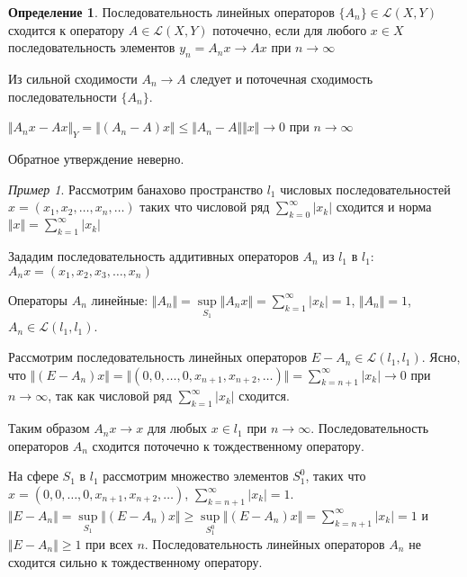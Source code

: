 \documentclass[12pt,a4paper,titlepage,oneside]{book}
\theoremstyle{definition}
\newtheorem*{definition}{Определение}
\theoremstyle{plain}
\theoremstyle{remark}
\theoremstyle{remark}
\newtheorem*{example}{Пример}
\theoremstyle{remark}
\theoremstyle{remark}
\theoremstyle{plain}
\theoremstyle{plain}
\begin{document}
\begin{definition}
Последовательность линейных операторов $\{A_n\}\in \mathcal{L}(X,Y)$ сходится к оператору $A\in \mathcal{L}(X,Y)$ поточечно, если для любого $x\in X$ последовательность элементов $y_n=A_nx\to Ax$ при $n\to \infty$
\end{definition}

Из сильной сходимости $A_n\to A$ следует и поточечная сходимость последовательности $\{A_n\}$.

\begin{center}
$\Vert A_nx-Ax\Vert_Y = \Vert(A_n-A)x\Vert\le \Vert A_n-A\Vert \Vert x\Vert\to 0$ при $n\to \infty$
\end{center}

Обратное утверждение неверно.

\begin{example}
Рассмотрим банахово пространство $l_1$ числовых последовательностей $x=(x_1,x_2,\ldots,x_n,\ldots)$ таких что числовой ряд $\displaystyle\sum_{k=0}^\infty \lvert x_k\rvert $ сходится и норма $\Vert x\Vert=\displaystyle\sum_{k=1}^\infty \lvert x_k\rvert $

Зададим последовательность аддитивных операторов $A_n$ из $l_1$ в $l_1$:
$A_nx=(x_1,x_2,x_3,\ldots,x_n)$

Операторы $A_n$ линейные:
$\Vert A_n\Vert=\sup \limits_{S_1} \Vert A_nx\Vert=\displaystyle\sum_{k=1}^\infty \lvert x_k\rvert =1$, $\Vert A_n\Vert=1$, $A_n\in \mathcal{L}(l_1,l_1)$.

Рассмотрим последовательность линейных операторов $E-A_n\in \mathcal{L}(l_1,l_1)$. Ясно, что $\Vert(E-A_n)x\Vert=\Vert(0,0,\ldots,0,x_{n+1},x_{n+2},\ldots)\Vert=\displaystyle\sum_{k=n+1}^\infty \lvert x_k\rvert  \to 0$ при $n\to \infty$, так как числовой ряд $\displaystyle\sum_{k=1}^\infty \lvert x_k\rvert $ сходится.

Таким образом $A_nx\to x$ для любых $x\in l_1$ при $n\to \infty$. Последовательность операторов $A_n$ сходится поточечно к тождественному оператору.

На сфере $S_1$ в $l_1$ рассмотрим множество элементов $S_1^0$, таких что $x=(0,0,\ldots,0,x_{n+1},x_{n+2},\ldots)$, $\displaystyle\sum_{k=n+1}^\infty \lvert x_k\rvert=1$.
$\Vert E-A_n\Vert=\sup \limits_{S_1} \Vert(E-A_n)x\Vert\ge \sup \limits_{S_1^0} \Vert(E-A_n)x\Vert=\displaystyle\sum_{k=n+1}^\infty \lvert x_k\rvert=1$ и $\Vert E-A_n\Vert\ge 1$ при всех $n$. Последовательность линейных операторов $A_n$ не сходится сильно к тождественному оператору.

\end{example}
\end{document}
